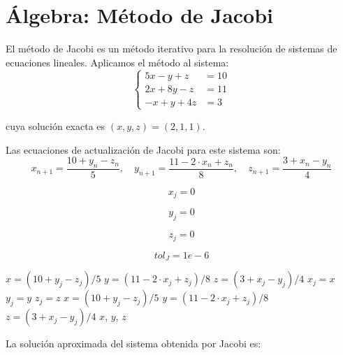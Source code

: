 \documentclass{article}
\begin{document}
\section{\'Algebra: M\'etodo de Jacobi}

El m\'etodo de Jacobi es un m\'etodo iterativo para la resoluci\'on de sistemas de
ecuaciones lineales. Aplicamos el m\'etodo al sistema:
\[
    \left \{
        \begin{array}{rr}
        5x-y+z & = 10 \\
        2x+8y-z & = 11 \\
        -x+y+4z & = 3
        \end{array}
    \right .
\]

cuya soluci\'on exacta es $(x, y, z) = (2,1,1)$.

Las ecuaciones de actualizaci\'on de Jacobi para este sistema son:
\[
    x_{n+1} = \frac{10 + y_n - z_n}{5}, \quad y_{n+1} = \frac{11 - 2\cdot x_n + z_n}{8}, \quad z_{n+1} = \frac{3 + x_n - y_n}{4}
\]

\begin{equation}
    x_j = 0
    \label{eq:calc:xj}
\end{equation}

\begin{equation}
    y_j = 0
    \label{eq:calc:yj}
\end{equation}

\begin{equation}
    z_j = 0
    \label{eq:calc:zj}
\end{equation}

\begin{equation}
    tol_{J} = 1e-6
    \label{eq:calc:tolJ}
\end{equation}

\begin{algorithm}
\caption{M\'etodo de Jacobi para $5x-y+z = 10$, $2x+8y-z = 11$, $-x+y+4z = 3$}
\begin{algorithmic}
    \STATE $x = (10 + y_j - z_j)/5$
    \STATE $y = (11 - 2\cdot x_j + z_j)/8$
    \STATE $z = (3 + x_j - y_j)/4$
        \STATE $x_j = x$
        \STATE $y_j = y$
        \STATE $z_j = z$
        \STATE $x = (10 + y_j - z_j)/5$
        \STATE $y = (11 - 2\cdot x_j + z_j)/8$
        \STATE $z = (3 + x_j - y_j)/4$
    \ENDWHILE
    \RETURN $x$, $y$, $z$
\end{algorithmic}
\end{algorithm}

La soluci\'on aproximada del sistema obtenida por Jacobi es:
\end{document}
